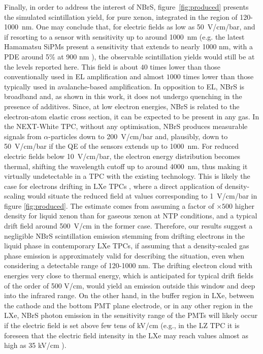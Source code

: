 \documentclass[%
 reprint,
superscriptaddress,
 amsmath,amssymb,
 aps,
]{revtex4-2}
\begin{document}
Finally, in order to address the interest of NBrS, figure~\ref{fig:produced} presents the simulated scintillation yield, for pure xenon, integrated in the region of 120-1000~nm. One may conclude that, for electric fields as low as 50~V/cm/bar, and if resorting to a sensor with sensitivity up to around 1000~nm (e.g. the latest Hamamatsu SiPMs present a sensitivity that extends to nearly 1000 nm, with a PDE around 5\% at 900 nm \cite{SiPMs}), the observable scintillation yields would still be at the levels reported here. This field is about $40$ times lower than those conventionally used in EL amplification and almost $1000$ times lower than those typically used in avalanche-based amplification. In opposition to EL, NBrS is broadband and, as shown in this work, it does not undergo quenching in the presence of additives. Since, at low electron energies, NBrS is related to the electron-atom elastic cross section, it can be expected to be present in any gas. 
In the NEXT-White TPC, without any optimisation, NBrS produces measurable signals from $\alpha$-particles down to 200~V/cm/bar and, plausibly, down to 50~V/cm/bar if the QE of the sensors extends up to 1000~nm. 
For reduced electric fields below 10~V/cm/bar, the electron energy distribution becomes thermal, shifting the wavelength cutoff up to around 4000~nm, thus making it virtually undetectable in a TPC with the existing technology. This is likely the case for electrons drifting in LXe TPCs \cite{XENON, LZ, EXO}, where a direct application of density-scaling would situate the reduced field at values corresponding to 1~V/cm/bar in figure \ref{fig:produced}. The estimate comes from assuming a factor of $\times 500$ higher density for liquid xenon than for gaseous xenon at NTP conditions, and a typical drift field around 500~V/cm in the former case. Therefore, our results suggest a negligible NBrS scintillation emission stemming from drifting electrons in the liquid phase in contemporary LXe TPCs, if assuming that a density-scaled gas phase emission is approximately valid for describing the situation, even when considering a detectable range of 120-1000 nm. The drifting electron cloud with energies very close to thermal energy, which is anticipated for typical drift fields of the order of 500 V/cm, would yield an emission outside this window and deep into the infrared range. On the other hand, in the buffer region in LXe, between the cathode and the bottom PMT plane electrode, or in any other region in the LXe, NBrS photon emission in the sensitivity range of the PMTs will likely occur if the electric field is set above few tens of kV/cm (e.g., in the LZ TPC it is foreseen that the electric field intensity in the LXe may reach values almost as high as 35 kV/cm \cite {LZ}).
\end{document}
